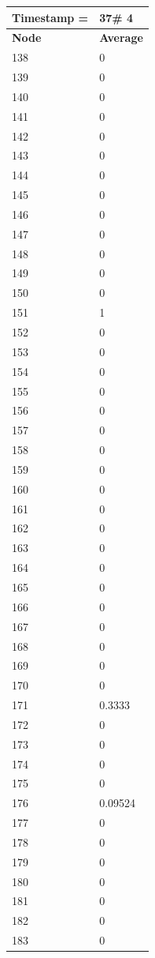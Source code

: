\begin{tabular}{|l||l|}
\hline
\textbf{Timestamp =} & \textbf{37}\# 4\\\hline
	\textbf{Node} & \textbf{Average} \\ \hline
\hline
	138 & 0 \\ \hline
	139 & 0 \\ \hline
	140 & 0 \\ \hline
	141 & 0 \\ \hline
	142 & 0 \\ \hline
	143 & 0 \\ \hline
	144 & 0 \\ \hline
	145 & 0 \\ \hline
	146 & 0 \\ \hline
	147 & 0 \\ \hline
	148 & 0 \\ \hline
	149 & 0 \\ \hline
	150 & 0 \\ \hline
	151 & 1 \\ \hline
	152 & 0 \\ \hline
	153 & 0 \\ \hline
	154 & 0 \\ \hline
	155 & 0 \\ \hline
	156 & 0 \\ \hline
	157 & 0 \\ \hline
	158 & 0 \\ \hline
	159 & 0 \\ \hline
	160 & 0 \\ \hline
	161 & 0 \\ \hline
	162 & 0 \\ \hline
	163 & 0 \\ \hline
	164 & 0 \\ \hline
	165 & 0 \\ \hline
	166 & 0 \\ \hline
	167 & 0 \\ \hline
	168 & 0 \\ \hline
	169 & 0 \\ \hline
	170 & 0 \\ \hline
	171 & 0.3333 \\ \hline
	172 & 0 \\ \hline
	173 & 0 \\ \hline
	174 & 0 \\ \hline
	175 & 0 \\ \hline
	176 & 0.09524 \\ \hline
	177 & 0 \\ \hline
	178 & 0 \\ \hline
	179 & 0 \\ \hline
	180 & 0 \\ \hline
	181 & 0 \\ \hline
	182 & 0 \\ \hline
	183 & 0 \\ \hline
\end{tabular}
